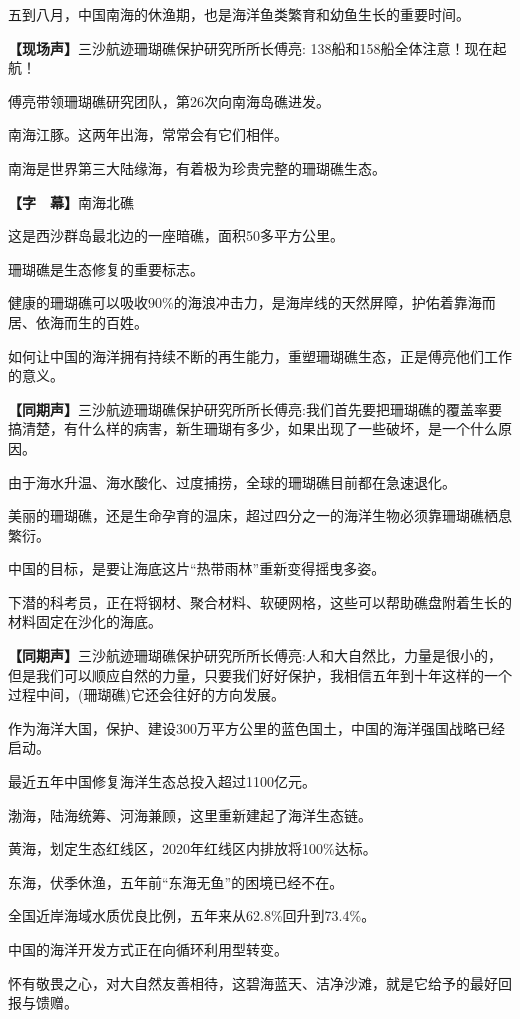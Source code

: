 \documentclass{ctexart}
\newcommand{\zkh}[1]{\textbf{\hspace{-2.7em} 【#1】}}
\begin{document}
 
五到八月，中国南海的休渔期，也是海洋鱼类繁育和幼鱼生长的重要时间。

 \zkh{现场声}三沙航迹珊瑚礁保护研究所所长傅亮: 138船和158船全体注意！现在起航！

 傅亮带领珊瑚礁研究团队，第26次向南海岛礁进发。

 南海江豚。这两年出海，常常会有它们相伴。

 南海是世界第三大陆缘海，有着极为珍贵完整的珊瑚礁生态。

 \zkh{字　幕}南海北礁

 这是西沙群岛最北边的一座暗礁，面积50多平方公里。

 珊瑚礁是生态修复的重要标志。

健康的珊瑚礁可以吸收90{\%}的海浪冲击力，是海岸线的天然屏障，护佑着靠海而居、依海而生的百姓。

如何让中国的海洋拥有持续不断的再生能力，重塑珊瑚礁生态，正是傅亮他们工作的意义。

 \zkh{同期声}三沙航迹珊瑚礁保护研究所所长傅亮:我们首先要把珊瑚礁的覆盖率要搞清楚，有什么样的病害，新生珊瑚有多少，如果出现了一些破坏，是一个什么原因。

 由于海水升温、海水酸化、过度捕捞，全球的珊瑚礁目前都在急速退化。

美丽的珊瑚礁，还是生命孕育的温床，超过四分之一的海洋生物必须靠珊瑚礁栖息繁衍。

 中国的目标，是要让海底这片``热带雨林''重新变得摇曳多姿。

下潜的科考员，正在将钢材、聚合材料、软硬网格，这些可以帮助礁盘附着生长的材料固定在沙化的海底。

 \zkh{同期声}三沙航迹珊瑚礁保护研究所所长傅亮:人和大自然比，力量是很小的，但是我们可以顺应自然的力量，只要我们好好保护，我相信五年到十年这样的一个过程中间，(珊瑚礁)它还会往好的方向发展。

 
作为海洋大国，保护、建设300万平方公里的蓝色国土，中国的海洋强国战略已经启动。

 最近五年中国修复海洋生态总投入超过1100亿元。

 渤海，陆海统筹、河海兼顾，这里重新建起了海洋生态链。

 黄海，划定生态红线区，2020年红线区内排放将100{\%}达标。

 东海，伏季休渔，五年前``东海无鱼''的困境已经不在。

 全国近岸海域水质优良比例，五年来从62.8{\%}回升到73.4{\%}。

 中国的海洋开发方式正在向循环利用型转变。

怀有敬畏之心，对大自然友善相待，这碧海蓝天、洁净沙滩，就是它给予的最好回报与馈赠。
\end{document}
